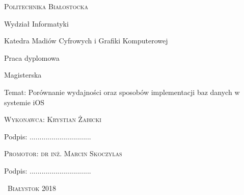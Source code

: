\begin{titlepage}
	
	\begin{center}
		{\scshape 
			{\Large Politechnika Białostocka}\par
			\vspace{0.5cm}
			{\large Wydział Informatyki}\par
			\vspace{0.5cm}
			{\large Katedra Madiów Cyfrowych i Grafiki Komputerowej}\par
			\vfill
			{\Large Praca dyplomowa}\par
			\vspace{0.1cm}
			{\Large Magisterska}\par
			\vspace{2cm}
			{\LARGE
				Temat: Porównanie wydajności oraz sposobów implementacji baz danych w systemie iOS
				\par
			}
			\vspace{2cm}
		}
		\begin{flushright}
			{\scshape
				{\large Wykonawca: Krystian Żabicki}\par
				\vspace{0.4cm}
				{\large Podpis: ...............................}\par	   
			}
		\end{flushright}
		\vspace{2cm}
		\begin{flushleft}
			{\scshape
				{\large Promotor: dr inż. Marcin Skoczylas}\par
				\vspace{0.4cm}
				{\large \hspace{0.73cm} Podpis: ...............................}\par	
			}
		\end{flushleft}
		\vfill
		{\scshape\large\ Białystok 2018}
	\end{center}
	
	
\end{titlepage}
